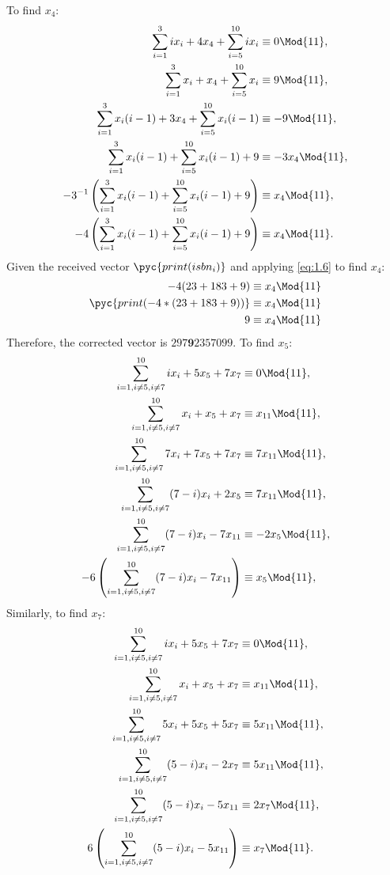 \qsubpart
To find $x_4$:
\begin{align}
\label{eq:1.6}
	\sum_{i=1}^{3}ix_i + 4x_4+\sum_{i=5}^{10} ix_i &\equiv 0 \Mod{11}\nonumber,\\
	\sum_{i=1}^{3}x_i + x_4+\sum_{i=5}^{10} x_i &\equiv 9 \Mod{11}\nonumber,\\
	\sum_{i=1}^{3}x_i(i-1) + 3x_4+\sum_{i=5}^{10} x_i(i-1) &\equiv -9 \Mod{11}\nonumber,\\
	\sum_{i=1}^{3}x_i(i-1) +\sum_{i=5}^{10} x_i(i-1) +9 &\equiv -3x_4 \Mod{11}\nonumber,\\
	-3^{-1}\left(\sum_{i=1}^{3}x_i(i-1)+\sum_{i=5}^{10} x_i(i-1) +9\right) &\equiv x_4 \Mod{11}\nonumber,\\
	-4\left(\sum_{i=1}^{3}x_i(i-1) +\sum_{i=5}^{10} x_i(i-1) +9\right) &\equiv x_4 \Mod{11}.
\end{align}
Given the received vector $\pyc{print(isbn_i)}$ and applying \eqref{eq:1.6} to find $x_4$:
\begin{align*}
	-4(23 + 183 + 9) \equiv x_4 \Mod{11}\\
	\pyc{print(-4*(23 + 183 + 9))}\equiv x_4 \Mod{11}\\
	9\equiv x_4 \Mod{11}\\
\end{align*}
Therefore, the corrected vector is $297\textbf{9}2357099$.
\qsubpart
To find $x_5$:
\begin{align}
\label{eq:1.7}
	\sum_{\substack{i=1, i\neq5, i\neq7}}^{10}ix_i +5x_5 + 7x_7 &\equiv 0 \Mod{11},\nonumber\\
	\sum_{\substack{i=1, i\neq5, i\neq7}}^{10}x_i  + x_5 +  x_7 &\equiv x_{11} \Mod{11},\nonumber\\
	\sum_{\substack{i=1, i\neq5, i\neq7}}^{10}7x_i  + 7x_5 + 7 x_7 &\equiv 7x_{11} \Mod{11},\nonumber\\
	\sum_{\substack{i=1, i\neq5, i\neq7}}^{10}(7-i)x_i + 2x_5 &\equiv 7x_{11} \Mod{11},\nonumber\\
	\sum_{\substack{i=1, i\neq5, i\neq7}}^{10}(7-i)x_i- 7x_{11} &\equiv -2x_5  \Mod{11},\nonumber\\
	-6\left(\sum_{\substack{i=1, i\neq5, i\neq7}}^{10}(7-i)x_i- 7x_{11}\right) &\equiv x_5  \Mod{11},\nonumber\\
\end{align}
Similarly, to find $x_7$:
\begin{align}
\label{eq:1.8}
	\sum_{\substack{i=1, i\neq5, i\neq7}}^{10}ix_i +5x_5 + 7x_7 &\equiv 0 \Mod{11},\nonumber\\
	\sum_{\substack{i=1, i\neq5, i\neq7}}^{10}x_i  + x_5 +  x_7 &\equiv x_{11} \Mod{11},\nonumber\\
	\sum_{\substack{i=1, i\neq5, i\neq7}}^{10}5x_i  + 5x_5 + 5 x_7 &\equiv 5x_{11} \Mod{11},\nonumber\\
	\sum_{\substack{i=1, i\neq5, i\neq7}}^{10}(5-i)x_i - 2x_7 &\equiv 5x_{11} \Mod{11},\nonumber\\
	\sum_{\substack{i=1, i\neq5, i\neq7}}^{10}(5-i)x_i - 5x_{11} &\equiv 2x_{7} \Mod{11},\nonumber\\
	6\left(\sum_{\substack{i=1, i\neq5, i\neq7}}^{10}(5-i)x_i - 5x_{11}\right) &\equiv x_{7} \Mod{11}.
\end{align}
